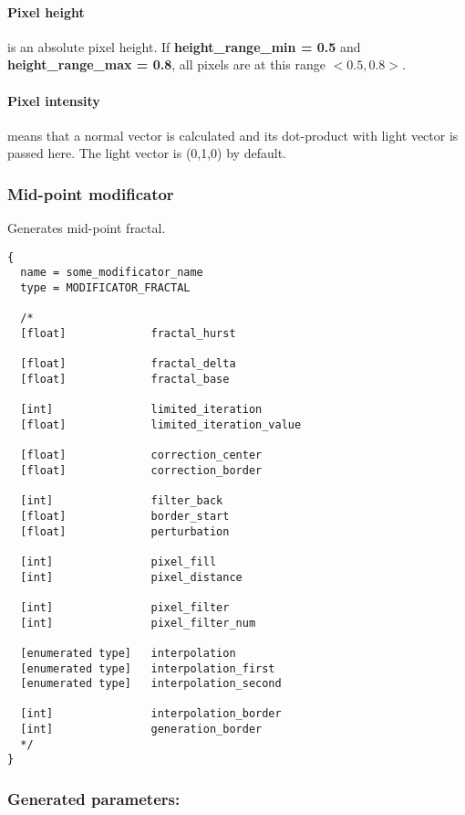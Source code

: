 \documentclass[9pt]{article}
\begin{document}
\paragraph*{Pixel height} is an absolute pixel height. 
If {\bf height\_range\_min = 0.5} and {\bf height\_range\_max = 0.8},
all pixels are at this range \begin{math}<0.5,0.8>\end{math}.

\paragraph*{Pixel intensity} means that a normal vector is 
calculated and its dot-product with light vector 
is passed here. The light vector is (0,1,0) by default.

\subsubsection{Mid-point modificator}

Generates mid-point fractal.

\begin{verbatim}
{
  name = some_modificator_name
  type = MODIFICATOR_FRACTAL

  /*
  [float]             fractal_hurst

  [float]             fractal_delta
  [float]             fractal_base
  
  [int]               limited_iteration
  [float]             limited_iteration_value
  
  [float]             correction_center
  [float]             correction_border
  
  [int]               filter_back
  [float]             border_start
  [float]             perturbation
  
  [int]               pixel_fill
  [int]               pixel_distance
  
  [int]               pixel_filter
  [int]               pixel_filter_num

  [enumerated type]   interpolation
  [enumerated type]   interpolation_first
  [enumerated type]   interpolation_second
  
  [int]               interpolation_border      
  [int]               generation_border
  */  
}
\end{verbatim}

\subsubsection*{Generated parameters:}
\end{document}
